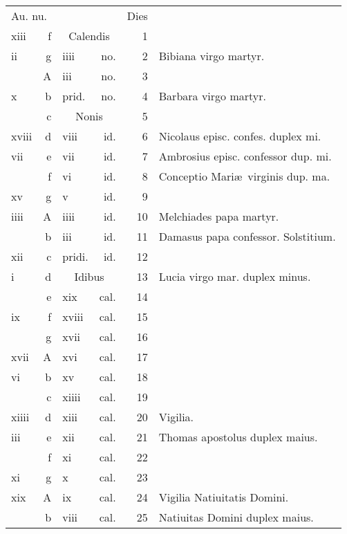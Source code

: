 \documentclass[a5paper,10pt]{book}
\def\ae{æ}
\begin{document}
\begin{center}
\begin{tabular}{l r l r r l}
\multicolumn{2}{l}{\color{red}Au. nu.} & & & \color{red} Dies & \\
xiii & f & \multicolumn{2}{c}{\color{red} Calendis} & 1 & \\
ii & g & iiii & no. & 2 & Bibiana virgo martyr. \\
 & \color{red} A & iii & no. & 3 & \\
x & b & \color{red} prid. & no. & 4 & Barbara virgo martyr. \color{black}\\
 & c & \multicolumn{2}{c}{\color{red} Nonis} & 5 & \\
xviii & d & viii & id. & 6 & \color{red} Nicolaus episc. confes. duplex mi. \color{black} \\
vii & e & vii & id. & 7 & Ambrosius episc. confessor dup. mi. \color{black} \\
 & f & vi & id. & 8 & \color{red} Conceptio Mari\ae \ virginis dup. ma. \color{black} \\
xv & g & v & id. & 9 & \\
iiii & \color{red} A & iiii & id. & 10 & Melchiades papa martyr. \\
 & b & iii & id. & 11 & Damasus papa confessor. Solstitium. \\%
xii & c & \color{red} pridi. & id. & 12 & \\
i & d & \multicolumn{2}{c}{\color{red} Idibus} & 13 & Lucia virgo mar. duplex minus. \\
 & e & xix & cal. & 14 & \\
ix & f & xviii & cal. & 15 & \\
 & g & xvii & cal. & 16 & \\
xvii & \color{red} A & xvi & cal. & 17 & \\
vi & b & xv & cal. & 18 & \\
 & c & xiiii & cal. & 19 & \\
xiiii & d & xiii & cal. & 20 & \qquad \qquad \qquad \color{red} Vigilia.\\
iii & e & xii & cal. & 21 & \color{red} Thomas apostolus duplex maius. \color{black} \\
 & f & xi & cal. & 22 & \\
xi & g & x & cal. & 23 & \\
xix & \color{red} A & ix & cal. & 24 & \qquad \quad \color{red} Vigilia Natiuitatis Domini. \color{black} \\
 & b & viii & cal. & 25 & \color{red} Natiuitas Domini duplex maius. \color{black} \\

\end{tabular}
\end{center}
\end{document}
